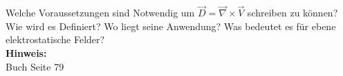 \begin{question}[section=3,subsection=31,name={Elektrostatisches Vektorpotential},difficulty=3,type=mdl,tags={}]
	Welche Voraussetzungen sind Notwendig um $ \vec D = \vec \nabla \times \vec V $ schreiben zu können? Wie wird es Definiert? Wo liegt seine Anwendung? Was bedeutet es für ebene elektrostatische Felder?
	\\ \textbf{Hinweis:}\\
	Buch Seite 79
\end{question}
\begin{solution}
	
\end{solution}